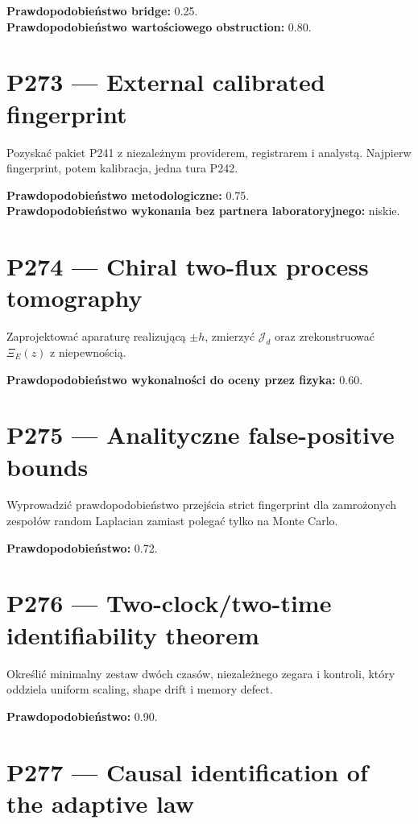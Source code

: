 \documentclass[11pt,a4paper,openany]{report}
\begin{document}
\textbf{Prawdopodobieństwo bridge:} 0.25.\\
\textbf{Prawdopodobieństwo wartościowego obstruction:} 0.80.

\section{P273 --- External calibrated fingerprint}

Pozyskać pakiet P241 z niezale\.znym providerem, registrarem i analystą. Najpierw fingerprint, potem kalibracja, jedna tura P242.

\textbf{Prawdopodobieństwo metodologiczne:} 0.75.\\
\textbf{Prawdopodobieństwo wykonania bez partnera laboratoryjnego:} niskie.

\section{P274 --- Chiral two-flux process tomography}

Zaprojektować aparaturę realizującą \(\pm h\), zmierzyć \(\mathcal J_d\) oraz zrekonstruować \(\Xi_E(z)\) z niepewnością.

\textbf{Prawdopodobieństwo wykonalności do oceny przez fizyka:} 0.60.

\section{P275 --- Analityczne false-positive bounds}

Wyprowadzić prawdopodobieństwo przejścia strict fingerprint dla zamro\.zonych zespołów random Laplacian zamiast polegać tylko na Monte Carlo.

\textbf{Prawdopodobieństwo:} 0.72.

\section{P276 --- Two-clock/\allowbreak{}two-time identifiability theorem}

Określić minimalny zestaw dwóch czasów, niezale\.znego zegara i kontroli, który oddziela uniform scaling, shape drift i memory defect.

\textbf{Prawdopodobieństwo:} 0.90.

\section{P277 --- Causal identification of the adaptive law}
\end{document}
